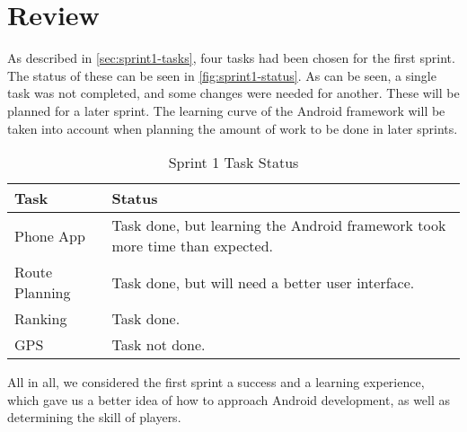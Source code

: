 \section{Review}
\label{sec:sprint1-review}

As described in \autoref{sec:sprint1-tasks}, four tasks had been chosen for the first sprint. The status of these can be seen in \autoref{fig:sprint1-status}. As can be seen, a single task was not completed, and some changes were needed for another. These will be planned for a later sprint. The learning curve of the Android framework will be taken into account when planning the amount of work to be done in later sprints.

\begin{table}[ht!]
	\centering
	\begin{tabular}{|l|p{8cm}|}
		\hline
		\textbf{Task} & \textbf{Status} \\
		\hline
		Phone App & Task done, but learning the Android framework took more time than expected. \\
		\hline
		Route Planning & Task done, but will need a better user interface. \\
		\hline
		Ranking & Task done. \\
		\hline
		\ac{GPS} & Task not done. \\
	\hline
	\end{tabular}
	\caption{Sprint 1 Task Status}
	\label{fig:sprint1-status}
\end{table}

All in all, we considered the first sprint a success and a learning experience, which gave us a better idea of how to approach Android development, as well as determining the skill of players.
